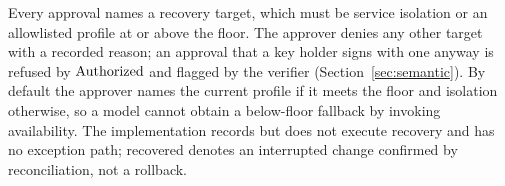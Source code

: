Every approval names a recovery target, which must be service isolation or an allowlisted profile at or above the floor. The approver denies any other target with a recorded reason; an approval that a key holder signs with one anyway is refused by $\mathrm{Authorized}$ and flagged by the verifier (Section~\ref{sec:semantic}). By default the approver names the current profile if it meets the floor and isolation otherwise, so a model cannot obtain a below-floor fallback by invoking availability. The implementation records but does not execute recovery and has no exception path; recovered denotes an interrupted change confirmed by reconciliation, not a rollback.
